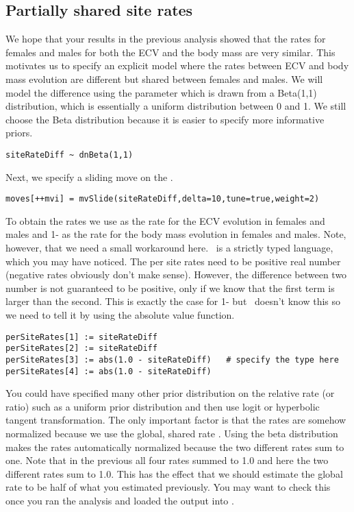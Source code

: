 \vspace{5cm}


\subsection{Partially shared site rates}
We hope that your results in the previous analysis showed that the rates for females and males for both the ECV and the body mass are very similar.
This motivates us to specify an explicit model where the rates between ECV and body mass evolution are different but shared between females and males.
We will model the difference using the  parameter which is drawn from a Beta(1,1) distribution, which is essentially a uniform distribution between 0 and 1.
We still choose the Beta distribution because it is easier to specify more informative priors.
{\tt \small \begin{snugshade*}
\begin{lstlisting}
siteRateDiff ~ dnBeta(1,1)
\end{lstlisting}
\end{snugshade*}}
Next, we specify a sliding move on the .
{\tt \small \begin{snugshade*}
\begin{lstlisting}
moves[++mvi] = mvSlide(siteRateDiff,delta=10,tune=true,weight=2)
\end{lstlisting}
\end{snugshade*}}
To obtain the rates we use  as the rate for the ECV evolution in females and males and 1- as the rate for the body mass evolution in females and males.
Note, however, that we need a small workaround here. \Rev~is a strictly typed language, which you may have noticed. The per site rates need to be positive real number (negative rates obviously don't make sense). However, the difference between two number is not guaranteed to be positive, only if we know that the first term is larger than the second. This is exactly the case for 1- but \RevBayes~doesn't know this so we need to tell it by using the absolute value  function.
{\tt \small \begin{snugshade*}
\begin{lstlisting}
perSiteRates[1] := siteRateDiff
perSiteRates[2] := siteRateDiff
perSiteRates[3] := abs(1.0 - siteRateDiff)   # specify the type here
perSiteRates[4] := abs(1.0 - siteRateDiff)
\end{lstlisting}
\end{snugshade*}}
You could have specified many other prior distribution on the relative rate (or ratio) such as a uniform prior distribution and then use logit or hyperbolic tangent transformation.
The only important factor is that the rates are somehow normalized because we use the global, shared rate .
Using the beta distribution makes the rates automatically normalized because the two different rates sum to one. Note that in the previous all four rates summed to 1.0 and here the two different rates sum to 1.0. This has the effect that we should estimate the global rate  to be half of what you estimated previously. You may want to check this once you ran the analysis and loaded the output into \Tracer. 


